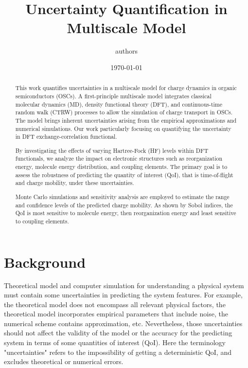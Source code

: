 \documentclass[letterpaper,12pt]{article}
\begin{document}
\linenumbers
\title{Uncertainty Quantification in Multiscale Model }
\author{authors}
\date{\today}
\maketitle
\begin{abstract}
    This work quantifies uncertainties in a multiscale model for charge dynamics in organic semiconductors (OSCs). A first-principle multiscale model integrates classical molecular dynamics (MD), density functional theory (DFT), and continuous-time random walk (CTRW) processes to allow the simulation of charge transport in OSCs. The model brings inherent uncertainties arising from the empirical approximations and numerical simulations. Our work particularly focusing on quantifying the uncertainty in DFT exchange-correlation functional.

    By investigating the effects of varying Hartree-Fock (HF) levels within DFT functionals, we analyze the impact on electronic structures such as reorganization energy, molecule energy distribution, and coupling elements. The primary goal is to assess the robustness of predicting the quantity of interest (QoI), that is time-of-flight and charge mobility, under these uncertainties.
    
    Monte Carlo simulations and sensitivity analysis are employed to estimate the range and confidence levels of the predicted charge mobility. As shown by Sobol indices, the QoI is most sensitive to molecule energy, then reorganization energy and least sensitive to coupling elements.  
\end{abstract}

\section{Background}

Theoretical model and computer simulation for understanding a physical system must contain some uncertainties in predicting the system features. 
For example, the theoretical model does not encompass all relevant physical factors, the theoretical model incorporates empirical parameters that include noise, the numerical scheme contains approximation, etc.
Nevertheless, those uncertainties should not affect the validity of the model or the accuracy for the predicting system in terms of some quantities of interest (QoI). 
Here the terminology "uncertainties" refers to the impossibility of getting a deterministic QoI, and excludes theoretical or numerical errors. 
\end{document}
